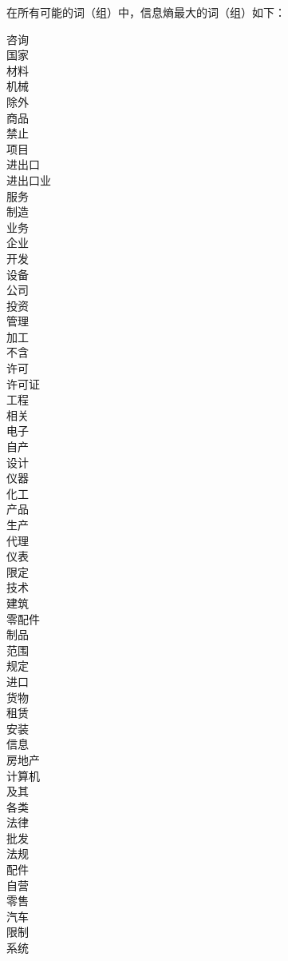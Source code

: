 \documentclass[12pt,a4paper]{article}
\begin{document}
\begin{CJK*}{UTF8}{song}
在所有可能的词（组）中，信息熵最大的词（组）如下：

\begin{multicols}{5}
咨询\\
国家\\
材料\\
机械\\
除外\\
商品\\
禁止\\
项目\\
进出口\\
进出口业\\
服务\\
制造\\
业务\\
企业\\
开发\\
设备\\
公司\\
投资\\
管理\\
加工\\
不含\\
许可\\
许可证\\
工程\\
相关\\
电子\\
自产\\
设计\\
仪器\\
化工\\
产品\\
生产\\
代理\\
仪表\\
限定\\
技术\\
建筑\\
零配件\\
制品\\
范围\\
规定\\
进口\\
货物\\
租赁\\
安装\\
信息\\
房地产\\
计算机\\
及其\\
各类\\
法律\\
批发\\
法规\\
配件\\
自营\\
零售\\
汽车\\
限制\\
系统
\end{multicols}


\end{CJK*}
\end{document}
